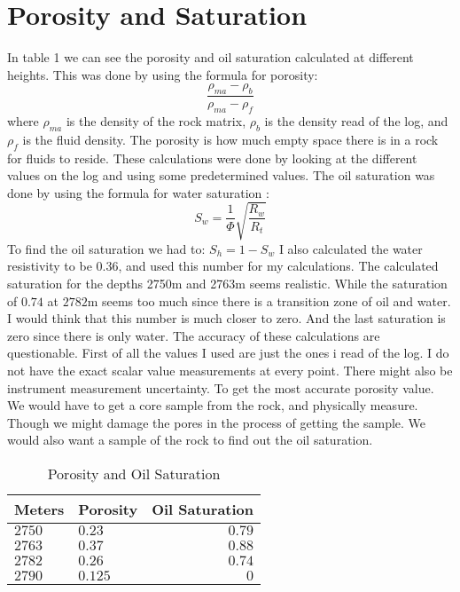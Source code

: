 \documentclass[DIV=calc, paper=a4, fontsize=11pt, twocolumn]{scrartcl}	 %
\begin{document}
\section*{Porosity and Saturation}
In table 1 we can see the porosity and oil saturation calculated at different heights. This was done by using the formula for porosity: 
$$ \frac{\rho_{ma}-\rho_{b}}{\rho_{ma}-\rho_f}     $$ where $\rho_{ma}$ is the density of the rock matrix, $\rho_{b}$ is the density read of the log, and  $\rho_{f}$ is the fluid density. 
\newline
The porosity is how much empty space there is in a rock for fluids to reside. These calculations were done by looking at the different values on the log and using some predetermined values. 
\newline
The oil saturation was done by using the formula for water saturation :
$$ S_w = \frac{1}{\Phi}\sqrt{\frac{R_w}{R_t}}  $$
To find the oil saturation we had to: $S_h = 1-S_w$
I also calculated the water resistivity to be 0.36, and used this number for my calculations.
The calculated saturation for the depths 2750m and 2763m seems realistic. While the saturation of $0.74$ at $2782$m seems too much since there is a transition zone of oil and water. I would think that this number is much closer to zero. And the last saturation is zero since there is only water. 
\newline
The accuracy of these calculations are questionable. First of all the values I used are just the ones i read of the log. I do not have the exact scalar value measurements at every point. There might also be instrument measurement uncertainty. 
To get the most accurate porosity value. We would have to get a core sample from the rock, and physically measure. Though we might damage the pores in the process of getting the sample. 
We would also want a sample of the rock to find out the oil saturation.	





\begin{table}
\caption{Porosity and Oil Saturation}
\centering
\begin{tabular}{llr}
\toprule
Meters & Porosity & Oil Saturation \\
\midrule
$2750$ & $0.23$ & $0.79$ \\
$2763$ & $0.37$ & $0.88$ \\
$2782$ & $0.26$ & $0.74$ \\
$2790$ & $0.125$ & $0$ \\

\bottomrule
\end{tabular}
\end{table}
\end{document}
